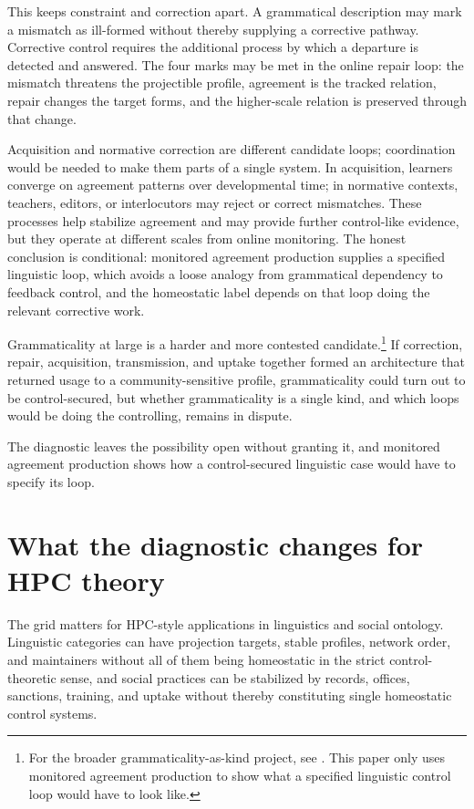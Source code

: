 \documentclass[12pt]{article}
\begin{document}
This keeps constraint and correction apart. A grammatical description may mark a
mismatch as ill-formed without thereby supplying a corrective pathway. Corrective
control requires the additional process by which a departure is detected and
answered. The four marks may be met in the online repair loop: the mismatch
threatens the projectible profile, agreement is the tracked relation, repair
changes the target forms, and the higher-scale relation is preserved through
that change.

Acquisition and normative correction are different candidate loops; coordination
would be needed to make them parts of a single system. In acquisition, learners
converge on agreement patterns over developmental time; in normative contexts,
teachers, editors, or interlocutors may reject or correct mismatches. These
processes help stabilize agreement and may provide further control-like evidence,
but they operate at different scales from online monitoring. The honest conclusion
is conditional: monitored agreement production supplies a specified linguistic
loop, which avoids a loose analogy from grammatical dependency to feedback control,
and the homeostatic label depends on that loop doing the relevant corrective work.

Grammaticality at large is a harder and more contested candidate.\footnote{For the
broader grammaticality-as-kind project, see
\textcite{reynoldsmiller2026grammaticality}. This paper only uses monitored
agreement production to show what a specified linguistic control loop would have to
look like.} If correction, repair, acquisition, transmission, and uptake together
formed an architecture that returned usage to a community-sensitive profile,
grammaticality could turn out to be control-secured, but whether grammaticality is
a single kind, and which loops would be doing the controlling, remains in dispute.

The diagnostic leaves the possibility open without granting it, and monitored
agreement production shows how a control-secured linguistic case would have to
specify its loop.

\section{What the diagnostic changes for HPC theory}

The grid matters for HPC-style applications in linguistics and social ontology.
Linguistic categories can have projection targets, stable profiles, network order,
and maintainers without all of them being homeostatic in the strict
control-theoretic sense, and social practices can be stabilized by records, offices,
sanctions, training, and uptake without thereby constituting single homeostatic
control systems.
\end{document}
